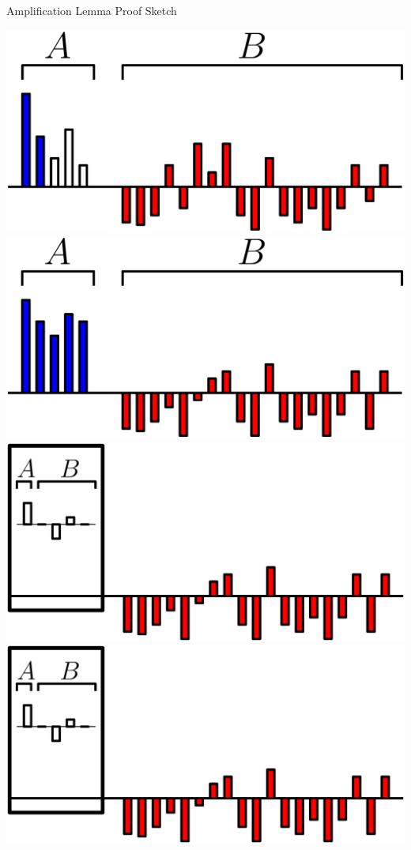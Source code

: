 \documentclass[xcolor=x11names, svgnames, rgb]{beamer}
\begin{document}
\begin{frame}[t]{Amplification Lemma Proof Sketch}
\begin{overprint}
     \includegraphics[width=\linewidth]{amppf/ani6.eps}
     \includegraphics[width=\linewidth]{amppf/ani7.eps}
     \includegraphics[width=\linewidth]{amppf/ani8.eps}
     \includegraphics[width=\linewidth]{amppf/ani8.eps}

\end{overprint}
\end{frame}
\end{document}
